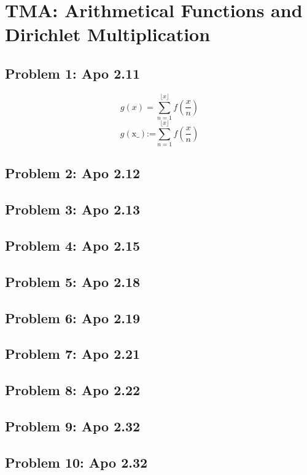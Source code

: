\section{TMA: Arithmetical Functions and Dirichlet Multiplication}

\subsection[Problem 1]{Problem 1: Apo 2.11}

$$
g(x)=\sum _{n=1}^{\lfloor x\rfloor } f\left(\frac{x}{n}\right)
$$
$$
g(\text{x$\_$})\text{:=}\sum _{n=1}^{\lfloor x\rfloor } f\left(\frac{x}{n}\right)
$$

\subsection[Problem 2]{Problem 2: Apo 2.12}

\subsection[Problem 3]{Problem 3: Apo 2.13}

\subsection[Problem 4]{Problem 4: Apo 2.15}

\subsection[Problem 5]{Problem 5: Apo 2.18}

\subsection[Problem 6]{Problem 6: Apo 2.19}

\subsection[Problem 7]{Problem 7: Apo 2.21}

\subsection[Problem 8]{Problem 8: Apo 2.22}

\subsection[Problem 9]{Problem 9: Apo 2.32}

\subsection[Problem 10]{Problem 10: Apo 2.32}